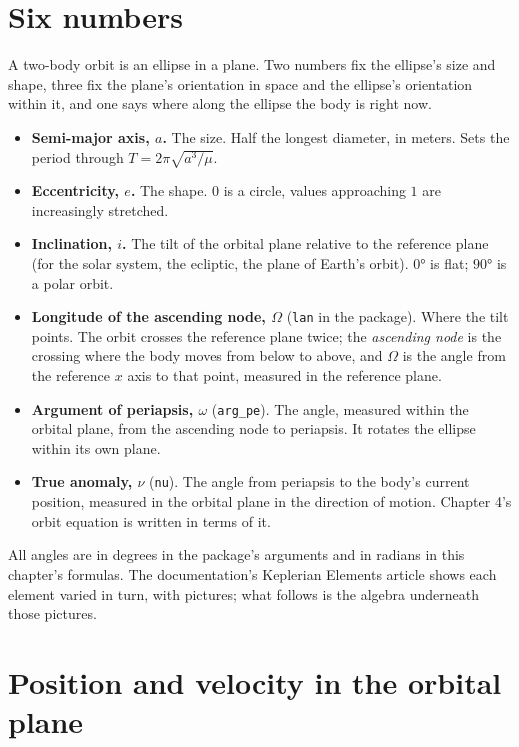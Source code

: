 \documentclass[
  10.5pt,
  letterpaper,
]{scrbook}
\providecommand{\tightlist}{%
  \setlength{\itemsep}{0pt}\setlength{\parskip}{0pt}}
\theoremstyle{plain}
\theoremstyle{remark}
\begin{document}
\section{Six numbers}\label{six-numbers}

A two-body orbit is an ellipse in a plane. Two numbers fix the ellipse's
size and shape, three fix the plane's orientation in space and the
ellipse's orientation within it, and one says where along the ellipse
the body is right now.

\begin{itemize}
\tightlist
\item
  \textbf{Semi-major axis, \(a\).} The size. Half the longest diameter,
  in meters. Sets the period through \(T = 2\pi\sqrt{a^3/\mu}\).
\item
  \textbf{Eccentricity, \(e\).} The shape. \(0\) is a circle, values
  approaching \(1\) are increasingly stretched.
\item
  \textbf{Inclination, \(i\).} The tilt of the orbital plane relative to
  the reference plane (for the solar system, the ecliptic, the plane of
  Earth's orbit). \(0°\) is flat; \(90°\) is a polar orbit.
\item
  \textbf{Longitude of the ascending node, \(\Omega\)} (\texttt{lan} in
  the package). Where the tilt points. The orbit crosses the reference
  plane twice; the \emph{ascending node} is the crossing where the body
  moves from below to above, and \(\Omega\) is the angle from the
  reference \(x\) axis to that point, measured in the reference plane.
\item
  \textbf{Argument of periapsis, \(\omega\)} (\texttt{arg\_pe}). The
  angle, measured within the orbital plane, from the ascending node to
  periapsis. It rotates the ellipse within its own plane.
\item
  \textbf{True anomaly, \(\nu\)} (\texttt{nu}). The angle from periapsis
  to the body's current position, measured in the orbital plane in the
  direction of motion. Chapter 4's orbit equation is written in terms of
  it.
\end{itemize}

All angles are in degrees in the package's arguments and in radians in
this chapter's formulas. The documentation's Keplerian Elements article
shows each element varied in turn, with pictures; what follows is the
algebra underneath those pictures.

\section{Position and velocity in the orbital
plane}\label{position-and-velocity-in-the-orbital-plane}
\end{document}
